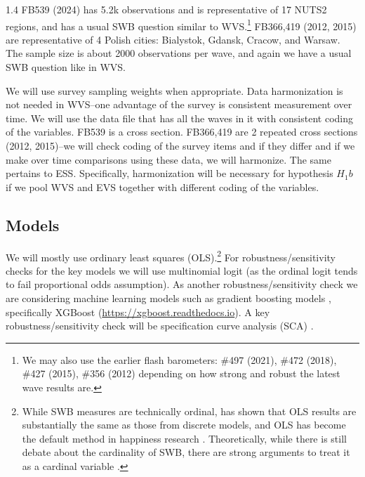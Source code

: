 \documentclass[10pt, letterpaper]{article}
\begin{document}
\begin{spacing}{1.4}
FB539 (2024) has 5.2k observations and is representative of
 17 NUTS2 regions, and has a usual SWB
 question similar to WVS.\footnote{We may also use
  the earlier flash barometers: \#497 (2021), \#472 (2018), \#427 (2015),  \#356 (2012)
  depending on how strong and robust the latest wave results are.} 
FB366,419 (2012, 2015) are representative of 4 Polish cities:
 Bialystok, Gdansk, Cracow, and Warsaw. The sample size is about 2000
 observations per wave, and again we have a usual SWB question like in WVS.

We will use survey sampling weights when appropriate. 
Data harmonization is not needed in WVS--one advantage of the survey is
consistent measurement over time. We will use the data
file  %
that has all the waves in it with consistent coding of the variables.  FB539 is
a cross section. FB366,419 are 2 repeated cross sections (2012, 2015)--we will
check coding of the survey items and if they differ and if we make over time
comparisons using these data, we will harmonize. The same pertains to
ESS. Specifically, harmonization will be necessary for hypothesis $H_1b$
 if we pool  WVS and EVS together with different coding of the variables. 


\subsection{Models}


We will mostly use ordinary least squares (OLS).\footnote{%
 While SWB measures are technically ordinal, 
\citet{carbonell04} has shown that OLS results are substantially the same as
those from discrete models, and  OLS has become the default method in happiness
research \citep{blanchflower11}. Theoretically, while there is still debate
about the cardinality of SWB, there are strong arguments to treat it as a
cardinal variable \citep{ng96,ng97,ng11}.} For robustness/sensitivity
checks for the key models we will use multinomial logit (as the ordinal logit
tends to fail proportional odds assumption). As another robustness/sensitivity
check we are considering machine learning models such as gradient boosting
models \citep{oparina25}, specifically XGBoost
 (\url{https://xgboost.readthedocs.io}). 
 A key robustness/sensitivity check will be specification curve analysis (SCA)
\citep{simonsohn20}.
 

\end{spacing}
\end{document}
